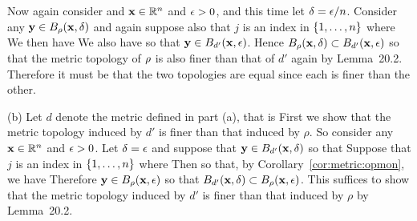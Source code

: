{{    Now again consider and $\mathbf{x} \in {\mathbb{R}}^n$ and $\epsilon > 0$, and this time let $\delta = \epsilon/n$.
    Consider any $\mathbf{y} \in B_\rho(\mathbf{x}, \delta)$ and again  suppose also that $j$ is an index in $\left\{ 1, \ldots, n \right\}$ where
    We then have
    We also have
    so that $\mathbf{y} \in B_{d'}(\mathbf{x}, \epsilon)$.
    Hence $B_\rho(\mathbf{x}, \delta) \subset B_{d'}(\mathbf{x}, \epsilon)$ so that the metric topology of $\rho$ is also finer than that of $d'$ again by Lemma~20.2.
    Therefore it must be that the two topologies are equal since each is finer than the other.
  }

  (b) Let $d$ denote the metric defined in part (a), that is
  First we show that the metric topology induced by $d'$ is finer than that induced by $\rho$.
  So consider any $\mathbf{x} \in {\mathbb{R}}^n$ and $\epsilon > 0$.
  Let $\delta = \epsilon$ and suppose that $\mathbf{y} \in B_{d'}(\mathbf{x}, \delta)$ so that
  Suppose that $j$ is an index in $\left\{ 1, \ldots, n \right\}$ where
  Then
  so that, by Corollary~\ref{cor:metric:opmon}, we have
  Therefore $\mathbf{y} \in B_\rho(\mathbf{x}, \epsilon)$ so that $B_{d'}(\mathbf{x}, \delta) \subset B_\rho(\mathbf{x}, \epsilon)$.
  This suffices to show that the metric topology induced by $d'$ is finer than that induced by $\rho$ by Lemma~20.2.

}
